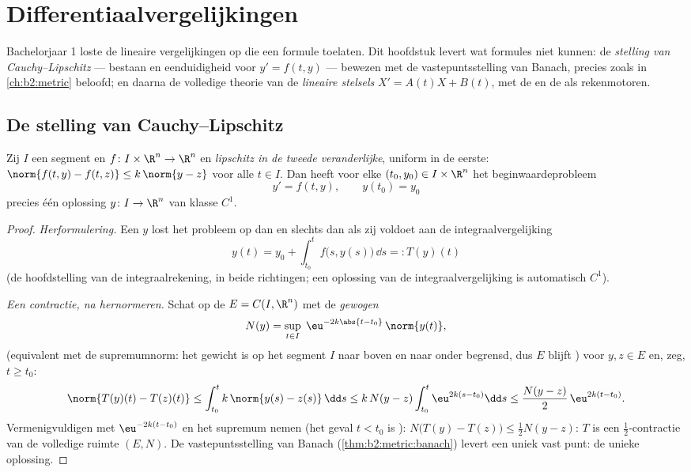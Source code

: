 \chapter{Differentiaalvergelijkingen}\label{ch:b2:diffeq}

Bachelorjaar 1 loste de lineaire vergelijkingen op die een formule
toelaten. Dit hoofdstuk levert wat formules niet kunnen: de
\emph{stelling van Cauchy--Lipschitz} --- bestaan en eenduidigheid
voor $y' = f(t, y)$ --- bewezen met de vastepuntsstelling van
Banach, precies zoals in \cref{ch:b2:metric} beloofd; en daarna de
volledige theorie van de \emph{lineaire stelsels} $X' = A(t)X +
B(t)$, met de  en de  als
rekenmotoren.

\section{De stelling van Cauchy--Lipschitz}

\begin{theorem}\label{thm:b2:diffeq:cauchylipschitz}
Zij $I$ een segment en $f \colon I \times \R^n \to \R^n$  en
\emph{lipschitz in de tweede veranderlijke}, uniform in de eerste:
$\norm{f(t, y) - f(t, z)} \leq k\,\norm{y - z}$ voor alle $t \in
I$. Dan heeft voor elke $(t_0, y_0) \in I \times \R^n$ het
beginwaardeprobleem
\[
y' = f(t, y), \qquad y(t_0) = y_0
\]
precies één oplossing $y \colon I \to \R^n$ van klasse $C^1$.
\end{theorem}

\begin{proof}
\emph{Herformulering.} Een  $y$ lost het probleem op dan en
slechts dan als zij voldoet aan de integraalvergelijking
\[
y(t) = y_0 + \int_{t_0}^{t} f\bigl(s, y(s)\bigr)\,\dd s
=: T(y)(t)
\]
(de hoofdstelling van de integraalrekening, in beide richtingen;
een  oplossing van de integraalvergelijking is automatisch
$C^1$).

\emph{Een contractie, na hernormeren.} Schat op de  $E
= C(I, \R^n)$ met de \emph{gewogen} 
\[
N(y) = \sup_{t \in I}\; \eu^{-2k\abs{t - t_0}}\,\norm{y(t)} ,
\]
(equivalent met de supremumnorm: het gewicht is op het segment $I$
naar boven en naar onder begrensd, dus $E$ blijft ) voor
$y, z \in E$ en, zeg, $t \geq t_0$:
\[
\norm{T(y)(t) - T(z)(t)}
\leq \int_{t_0}^{t} k\,\norm{y(s) - z(s)}\,\dd s
\leq k\,N(y - z)\int_{t_0}^{t} \eu^{2k(s - t_0)}\dd s
\leq \frac{N(y-z)}{2}\,\eu^{2k(t - t_0)} .
\]
Vermenigvuldigen met $\eu^{-2k(t - t_0)}$ en het supremum nemen
(het geval $t < t_0$ is ): $N\bigl(T(y) - T(z)\bigr)
\leq \frac12 N(y - z)$: $T$ is een $\frac12$-contractie van de
volledige ruimte $(E, N)$. De vastepuntsstelling van Banach
(\cref{thm:b2:metric:banach}) levert een uniek vast punt: de
unieke oplossing.
\end{proof}

